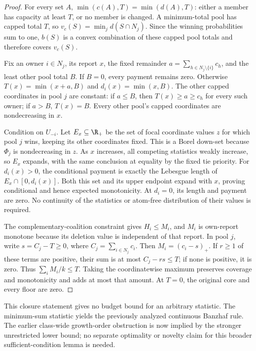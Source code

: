 \begin{proof}
For every set $A$, $\min(c(A),T)=\min(d(A),T)$: either a member has
capacity at least $T$, or no member is changed. A minimum-total pool
has capped total $T$, so $v_c(S)=\min_jd(S\cap N_j)$.
Since the winning probabilities sum to one, $b(S)$ is a convex combination
of these capped pool totals and therefore covers $v_c(S)$.

Fix an owner $i\in N_j$, its report $x$, the fixed remainder
$a=\sum_{h\in N_j\setminus\{i\}}c_h$, and the least other pool total
$B$. If $B=0$, every payment remains zero. Otherwise
$T(x)=\min(x+a,B)$ and $d_i(x)=\min(x,B)$.
The other capped coordinates in pool $j$ are constant: if $a\le B$,
then $T(x)\ge a\ge c_h$ for every such owner; if $a>B$, $T(x)=B$.
Every other pool's capped coordinates are nondecreasing in $x$.

Condition on $U_{-i}$. Let $E_x\subseteq\R_+$ be the set of focal
coordinate values $z$ for which pool $j$ wins, keeping its other coordinates
fixed. This is a Borel down-set because $\Phi_j$ is nondecreasing in $z$.
As $x$ increases, all competing statistics weakly increase, so $E_x$
expands, with the same conclusion at equality by the fixed tie priority.
For $d_i(x)>0$, the conditional payment is exactly the Lebesgue length
of $E_x\cap[0,d_i(x)]$. Both this set and its upper endpoint expand with
$x$, proving conditional and hence expected monotonicity. At $d_i=0$,
its length and payment are zero. No continuity of the statistics or
atom-free distribution of their values is required.

The complementary-coalition constraint gives $H_i\le M_i$, and
$M_i$ is own-report monotone because its deletion value is independent
of that report. In pool $j$, write $s=C_j-T\ge0$, where
$C_j=\sum_{i\in N_j}c_i$. Then $M_i=(c_i-s)_+$.
If $r\ge1$ of these terms are positive, their sum is at most
$C_j-rs\le T$; if none is positive, it is zero.
Thus $\sum_iM_i/k\le T$. Taking the coordinatewise maximum preserves
coverage and monotonicity and adds at most that amount. At $T=0$, the
original core and every floor are zero.
\end{proof}
This closure statement gives no budget bound for an arbitrary statistic.
The minimum-sum statistic yields the previously analyzed continuous
Banzhaf rule. The earlier class-wide growth-order obstruction is now
implied by the stronger unrestricted lower bound; no separate optimality
or novelty claim for this broader sufficient-condition lemma is needed.
